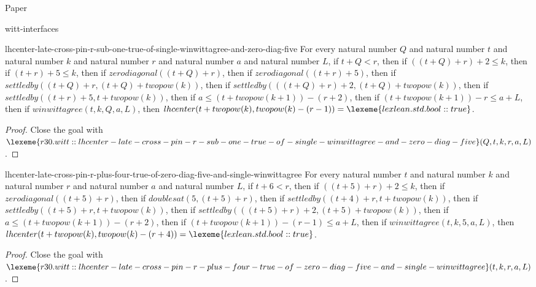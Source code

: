 \begin{lexlean}{Paper}
\begin{section}{witt-interfaces}
  \begin{theorem}{lhcenter-late-cross-pin-r-sub-one-true-of-single-winwittagree-and-zero-diag-five}
  For every natural number \(Q\) and natural number \(t\) and natural number \(k\) and natural number \(r\) and natural number \(a\) and natural number \(L\), if \(t + Q < r\), then if \(((t + Q) + r) + 2 ≤ k\), then if \((t + r) + 5 ≤ k\), then if \(zerodiagonal((t + Q) + r)\), then if \(zerodiagonal((t + r) + 5)\), then if \(settledby((t + Q) + r, (t + Q) + twopow(k))\), then if \(settledby(((t + Q) + r) + 2, (t + Q) + twopow(k))\), then if \(settledby((t + r) + 5, t + twopow(k))\), then if \(a ≤ (t + twopow(k + 1)) - (r + 2)\), then if \((t + twopow(k + 1)) - r ≤ a + L\), then if \(winwittagree(t, k, Q, a, L)\), then \(lhcenter(t + twopow(k), twopow(k) - (r - 1)) = \lexeme{lexlean.std.bool::true}\).
  \begin{proof}
  Close the goal with \(\lexeme{r30.witt::lhcenter-late-cross-pin-r-sub-one-true-of-single-winwittagree-and-zero-diag-five}(Q, t, k, r, a, L)\).
  \end{proof}
  \end{theorem}

  \begin{theorem}{lhcenter-late-cross-pin-r-plus-four-true-of-zero-diag-five-and-single-winwittagree}
  For every natural number \(t\) and natural number \(k\) and natural number \(r\) and natural number \(a\) and natural number \(L\), if \(t + 6 < r\), then if \(((t + 5) + r) + 2 ≤ k\), then if \(zerodiagonal((t + 5) + r)\), then if \(doublesat(5, (t + 5) + r)\), then if \(settledby((t + 4) + r, t + twopow(k))\), then if \(settledby((t + 5) + r, t + twopow(k))\), then if \(settledby(((t + 5) + r) + 2, (t + 5) + twopow(k))\), then if \(a ≤ (t + twopow(k + 1)) - (r + 2)\), then if \((t + twopow(k + 1)) - (r - 1) ≤ a + L\), then if \(winwittagree(t, k, 5, a, L)\), then \(lhcenter(t + twopow(k), twopow(k) - (r + 4)) = \lexeme{lexlean.std.bool::true}\).
  \begin{proof}
  Close the goal with \(\lexeme{r30.witt::lhcenter-late-cross-pin-r-plus-four-true-of-zero-diag-five-and-single-winwittagree}(t, k, r, a, L)\).
  \end{proof}
  \end{theorem}


\end{section}
\end{lexlean}
